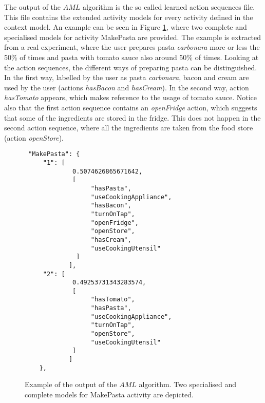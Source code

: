 The output of the $AML$ algorithm is the so called learned action sequences file. This file contains the extended activity models for every activity defined in the context model. An example can be seen in Figure \ref{fig-aml-output}, where two complete and specialised models for activity MakePasta are provided. The example is extracted from a real experiment, where the user prepares pasta \textit{carbonara} more or less the 50\% of times and pasta with tomato sauce also around 50\% of times. Looking at the action sequences, the different ways of preparing pasta can be distinguished. In the first way, labelled by the user as pasta \textit{carbonara}, bacon and cream are used by the user (actions \textit{hasBacon} and \textit{hasCream}). In the second way, action \textit{hasTomato} appears, which makes reference to the usage of tomato sauce. Notice also that the first action sequence contains an \textit{openFridge} action, which suggests that some of the ingredients are stored in the fridge. This does not happen in the second action sequence, where all the ingredients are taken from the food store (action \textit{openStore}).

\begin{figure}[htbp]
\begin{small}
\begin{lstlisting}
 "MakePasta": {
     "1": [          
             0.5074626865671642, 
             [
                  "hasPasta", 
                  "useCookingAppliance", 
                  "hasBacon", 
                  "turnOnTap", 
                  "openFridge", 
                  "openStore", 
                  "hasCream", 
                  "useCookingUtensil"
              ]
            ],
     "2": [
             0.49253731343283574, 
             [
                  "hasTomato", 
                  "hasPasta", 
                  "useCookingAppliance", 
                  "turnOnTap", 
                  "openStore", 
                  "useCookingUtensil"
             ]
            ]        
    }, 

\end{lstlisting}
\end{small}
\caption{Example of the output of the $AML$ algorithm. Two specialised and complete models for MakePasta activity are depicted.}
\label{fig-aml-output}
\end{figure}



